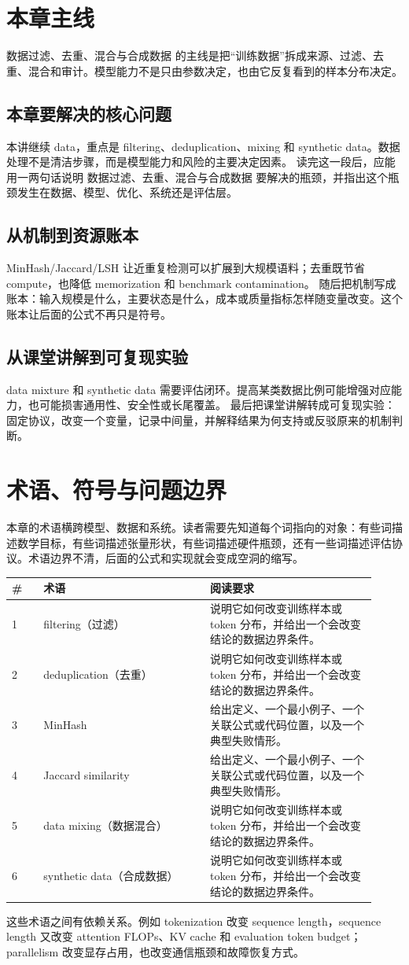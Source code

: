 \documentclass[a4paper]{article}
\begin{document}
\section{本章主线}
数据过滤、去重、混合与合成数据 的主线是把“训练数据”拆成来源、过滤、去重、混合和审计。模型能力不是只由参数决定，也由它反复看到的样本分布决定。
\subsection{本章要解决的核心问题}
本讲继续 data，重点是 filtering、deduplication、mixing 和 synthetic data。数据处理不是清洁步骤，而是模型能力和风险的主要决定因素。
读完这一段后，应能用一两句话说明 数据过滤、去重、混合与合成数据 要解决的瓶颈，并指出这个瓶颈发生在数据、模型、优化、系统还是评估层。
\subsection{从机制到资源账本}
MinHash/Jaccard/LSH 让近重复检测可以扩展到大规模语料；去重既节省 compute，也降低 memorization 和 benchmark contamination。
随后把机制写成账本：输入规模是什么，主要状态是什么，成本或质量指标怎样随变量改变。这个账本让后面的公式不再只是符号。
\subsection{从课堂讲解到可复现实验}
data mixture 和 synthetic data 需要评估闭环。提高某类数据比例可能增强对应能力，也可能损害通用性、安全性或长尾覆盖。
最后把课堂讲解转成可复现实验：固定协议，改变一个变量，记录中间量，并解释结果为何支持或反驳原来的机制判断。
\section{术语、符号与问题边界}
本章的术语横跨模型、数据和系统。读者需要先知道每个词指向的对象：有些词描述数学目标，有些词描述张量形状，有些词描述硬件瓶颈，还有一些词描述评估协议。术语边界不清，后面的公式和实现就会变成空洞的缩写。
\begin{longtable}{p{0.08\linewidth}p{0.42\linewidth}p{0.42\linewidth}}
\toprule
\textbf{\#} & \textbf{术语} & \textbf{阅读要求}\\
\midrule
1 & filtering（过滤） & 说明它如何改变训练样本或 token 分布，并给出一个会改变结论的数据边界条件。\\
2 & deduplication（去重） & 说明它如何改变训练样本或 token 分布，并给出一个会改变结论的数据边界条件。\\
3 & MinHash & 给出定义、一个最小例子、一个关联公式或代码位置，以及一个典型失败情形。\\
4 & Jaccard similarity & 给出定义、一个最小例子、一个关联公式或代码位置，以及一个典型失败情形。\\
5 & data mixing（数据混合） & 说明它如何改变训练样本或 token 分布，并给出一个会改变结论的数据边界条件。\\
6 & synthetic data（合成数据） & 说明它如何改变训练样本或 token 分布，并给出一个会改变结论的数据边界条件。\\
\bottomrule
\end{longtable}
这些术语之间有依赖关系。例如 tokenization 改变 sequence length，sequence length 又改变 attention FLOPs、KV cache 和 evaluation token budget；parallelism 改变显存占用，也改变通信瓶颈和故障恢复方式。
\end{document}

